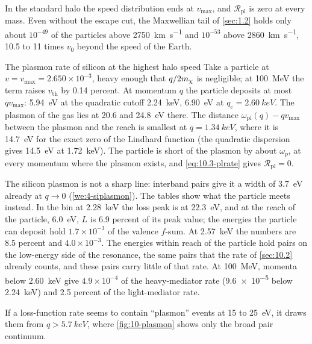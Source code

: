 In the standard halo the speed distribution ends at $v_{\mathrm{max}}$, and $\mathcal{R}_{\mathrm{pl}}$ is zero at every mass. Even without the escape cut, the Maxwellian tail of \cref{sec:1.2} holds only about $10^{-49}$ of the particles above \SI{2750}{km.s^{-1}} and $10^{-53}$ above \SI{2860}{km.s^{-1}}, 10.5 to 11 times $v_0$ beyond the speed of the Earth.

\begin{workedexample}{The plasmon rate of silicon at the highest halo speed}\label{we:10-plasmon}
Take a particle at $v = v_{\mathrm{max}} = 2.650\times10^{-3}$, heavy enough that $q/2m_{\chi}$ is negligible; at \SI{100}{MeV} the term raises $v_{\mathrm{th}}$ by 0.14 percent. At momentum $q$ the particle deposits at most $qv_{\mathrm{max}}$: \SI{5.94}{eV} at the quadratic cutoff \SI{2.24}{keV}, \SI{6.90}{eV} at $q_{\mathrm{c}} = \SI{2.60}{keV}$. The plasmon of the gas lies at 20.6 and \SI{24.8}{eV} there. The distance $\omega_{\mathrm{pl}}(q) - qv_{\mathrm{max}}$ between the plasmon and the reach is smallest at $q = \SI{1.34}{keV}$, where it is \SI{14.7}{eV} for the exact zero of the Lindhard function (the quadratic dispersion gives \SI{14.5}{eV} at \SI{1.72}{keV}). The particle is short of the plasmon by about $\omega_p$, at every momentum where the plasmon exists, and \cref{eq:10.3-plrate} gives $\mathcal{R}_{\mathrm{pl}} = 0$.

The silicon plasmon is not a sharp line: interband pairs give it a width of \SI{3.7}{eV} already at $q \to 0$ (\cref{we:4-siplasmon}). The tables show what the particle meets instead. In the bin at \SI{2.28}{keV} the loss peak is at \SI{22.3}{eV}, and at the reach of the particle, \SI{6.0}{eV}, $L$ is 6.9 percent of its peak value; the energies the particle can deposit hold $1.7\times10^{-3}$ of the valence $f$-sum. At \SI{2.57}{keV} the numbers are 8.5 percent and $4.0\times10^{-3}$. The energies within reach of the particle hold pairs on the low-energy side of the resonance, the same pairs that the rate of \cref{sec:10.2} already counts, and these pairs carry little of that rate. At \SI{100}{MeV}, momenta below \SI{2.60}{keV} give $4.9\times10^{-4}$ of the heavy-mediator rate (\num{9.6e-5} below \SI{2.24}{keV}) and 2.5 percent of the light-mediator rate.

If a loss-function rate seems to contain ``plasmon'' events at 15 to \SI{25}{eV}, it draws them from $q > \SI{5.7}{keV}$, where \cref{fig:10-plasmon} shows only the broad pair continuum.
\end{workedexample}

